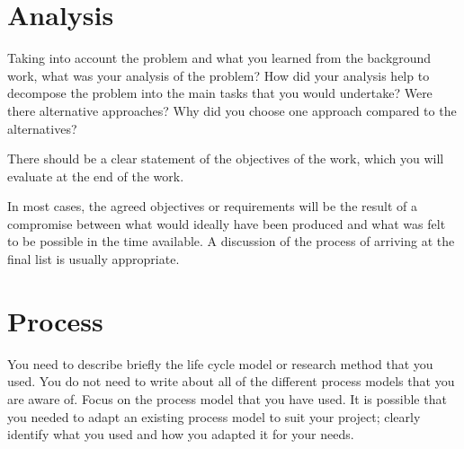 \section{Analysis}
Taking into account the problem and what you learned from the background work, what was your analysis of the problem? How did your analysis help to decompose the problem into the main tasks that you would undertake? Were there alternative approaches? Why did you choose one approach compared to the alternatives? 

There should be a clear statement of the objectives of the work, which you will evaluate at the end of the work. 

In most cases, the agreed objectives or requirements will be the result of a compromise between what would ideally have been produced and what was felt to be possible in the time available. A discussion of the process of arriving at the final list is usually appropriate.

\section{Process}
You need to describe briefly the life cycle model or research method that you used. You do not need to write about all of the different process models that you are aware of. Focus on the process model that you have used. It is possible that you needed to adapt an existing process model to suit your project; clearly identify what you used and how you adapted it for your needs.

